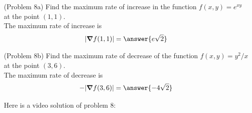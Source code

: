 \documentclass[handout]{ximera}
\begin{document}
\begin{problem}(Problem 8a)
Find the maximum rate of increase in the function $f(x,y) = e^{xy}$ at the 
point $(1, 1)$.\\
The maximum rate of increase is 
\[
|\grad f(1, 1)| = \answer{e\sqrt 2}
\]
\end{problem}

\begin{problem}(Problem 8b)
Find the maximum rate of decrease of the function $f(x,y) = y^2/x$ at the 
point $(3, 6)$.\\
The maximum rate of decrease is 
\[
-|\grad f(3, 6)| = \answer{-4\sqrt 2}
\]
\end{problem}

Here is a video solution of problem 8:\\
\begin{foldable}
\end{foldable}
\end{document}
